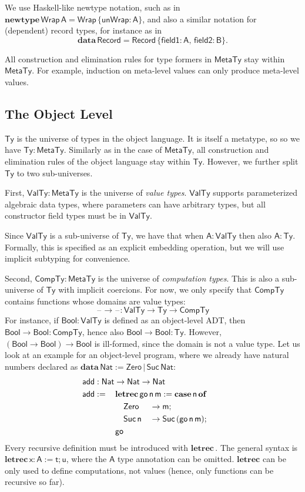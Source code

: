 \documentclass[acmsmall,screen,review,anonymous]{acmart}
\newcommand{\mit}[1]{{\mathsf{#1}}}
\newcommand{\msf}[1]{{\mathsf{#1}}}
\newcommand{\mbf}[1]{{\mathbf{#1}}}
\newcommand{\bs}[1]{\boldsymbol{#1}}
\newcommand{\ind}{\hspace{1em}}
\newcommand{\data}{\mbf{data}\,}
\newcommand{\letrec}{\mbf{letrec}\,}
\newcommand{\of}{\mbf{of}\,}
\newcommand{\go}{\mit{go}}
\newcommand{\add}{\mit{add}}
\newcommand{\vm}{\mathsf{m}}
\newcommand{\vn}{\mathsf{n}}
\newcommand{\vA}{\mathsf{A}}
\newcommand{\vB}{\mathsf{B}}
\newcommand{\vx}{\mathsf{x}}
\newcommand{\vt}{\mathsf{t}}
\newcommand{\vu}{\mathsf{u}}
\newcommand{\Bool}{\msf{Bool}}
\newcommand{\case}{\mbf{case\,}}
\newcommand{\MTy}{\msf{MetaTy}}
\newcommand{\VTy}{\msf{ValTy}}
\newcommand{\Ty}{\msf{Ty}}
\newcommand{\CTy}{\msf{CompTy}}
\newcommand{\blank}{{\mathord{\hspace{1pt}\text{--}\hspace{1pt}}}}
\newcommand{\Nat}{\msf{Nat}}
\newcommand{\Zero}{\msf{Zero}}
\newcommand{\Suc}{\msf{Suc}}
\theoremstyle{remark}
\newcommand{\newtype}{\mbf{newtype}\,}
\begin{document}
We use Haskell-like newtype notation, such as in $\newtype \msf{Wrap}\,\vA =
\msf{Wrap}\,\{\mit{unWrap} : \vA \}$, and also a similar notation for (dependent)
record types, for instance as in
\[\data \msf{Record} = \msf{Record}\,\{\mit{field1} : \vA,\,\mit{field2} : \vB\}.\]

All construction and elimination rules for type formers in $\MTy$ stay within
$\MTy$. For example, induction on meta-level values can only produce meta-level
values.

\subsection{The Object Level}\label{sec:the-object-level}

$\bs{\Ty}$ is the universe of types in the object language. It is itself a
metatype, so so we have $\Ty : \MTy$. Similarly as in the case of $\MTy$, all
construction and elimination rules of the object language stay within $\Ty$.
However, we further split $\Ty$ to two sub-universes.

First, $\bs{\VTy} : \MTy$ is the universe of \emph{value types}. $\VTy$ supports
parameterized algebraic data types, where parameters can have arbitrary types,
but all constructor field types must be in $\VTy$.

Since $\VTy$ is a sub-universe of $\Ty$, we have that when $\vA : \VTy$ then also
$\vA : \Ty$. Formally, this is specified as an explicit embedding operation, but
we will use implicit subtyping for convenience.

Second, $\bs{\CTy} : \MTy$ is the universe of \emph{computation types}. This is
also a sub-universe of $\Ty$ with implicit coercions. For now, we only specify
that $\CTy$ contains functions whose domains are value types:
\[ \blank\to\blank : \VTy \to \Ty \to \CTy \]
For instance, if $\Bool : \VTy$ is defined as an object-level ADT, then $\Bool
\to \Bool : \CTy$, hence also $\Bool \to \Bool : \Ty$. However, $(\Bool \to
\Bool) \to \Bool$ is ill-formed, since the domain is not a value type. Let us look at an
example for an object-level program, where we already have natural numbers
declared as $\data \Nat := \Zero\,|\,\Suc\,\Nat$:
\begin{alignat*}{3}
  &\hspace{-1em}\rlap{$\add : \Nat \to \Nat \to \Nat$}\\
  &\hspace{-1em}\add :=\,&& \mathrlap{\letrec \go\,\vn\,\vm := \case \vn\,\of}\\
  &\hspace{-1em}         && \ind \Zero     &&\to \vm;\\
  &\hspace{-1em}         && \ind \Suc\,\vn &&\to \Suc\,(\go\,\vn\,\vm);\\
  &\hspace{-1em}         && \go
\end{alignat*}
Every recursive definition must be introduced with $\letrec$. The general syntax
is $\letrec \vx : \vA := \vt; \vu$, where the $\vA$ type annotation can be
omitted. $\mbf{letrec}$ can be only used to define computations, not values
(hence, only functions can be recursive so far).
\end{document}
